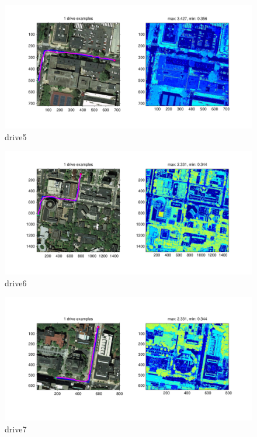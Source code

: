 \documentclass[twoside]{article}
\begin{document}
\begin{multicols}{2}
\begin{figure}[H]
\centering
\includegraphics[width=\columnwidth]{fig/drive5.pdf}
\caption{drive5}
\label{fig:drive5}
\end{figure}

\begin{figure}[H]
\centering
\includegraphics[width=\columnwidth]{fig/drive6.pdf}
\caption{drive6}
\label{fig:drive6}
\end{figure}

\begin{figure}[H]
\centering
\includegraphics[width=\columnwidth]{fig/drive7.pdf}
\caption{drive7}
\label{fig:drive7}
\end{figure}


\end{multicols}
\end{document}
